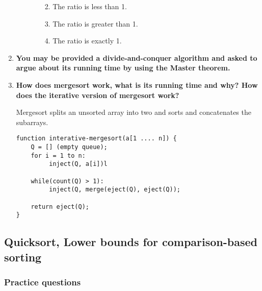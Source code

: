 \documentclass[a4paper,11pt]{article}
\begin{document}
\begin{enumerate}
\begin{itemize}
\begin{enumerate}
      \begin{enumerate}
      \def\labelenumiii{\arabic{enumiii}.}
      \itemsep1pt\parskip0pt
      \item
        The ratio is less than 1.
      \item
        The ratio is greater than 1.
      \item
        The ratio is exactly 1.
      \end{enumerate}
    \end{enumerate}
  \end{itemize}
\item
  \textbf{You may be provided a divide-and-conquer algorithm and asked
  to argue about its running time by using the Master theorem.}
\item
  \textbf{How does mergesort work, what is its running time and why? How
  does the iterative version of mergesort work?}

  Mergesort splits an unsorted array into two and sorts and concatenates
  the subarrays.

\begin{verbatim}
function interative-mergesort(a[1 .... n]) {
    Q = [] (empty queue);
    for i = 1 to n:
         inject(Q, a[i])l

    while(count(Q) > 1):
         inject(Q, merge(eject(Q), eject(Q));

    return eject(Q);
}
\end{verbatim}
\end{enumerate}

\subsection{Quicksort, Lower bounds for comparison-based
sorting}\label{quicksort-lower-bounds-for-comparison-based-sorting}

\subsubsection{Practice questions}\label{practice-questions-6}
\end{document}
